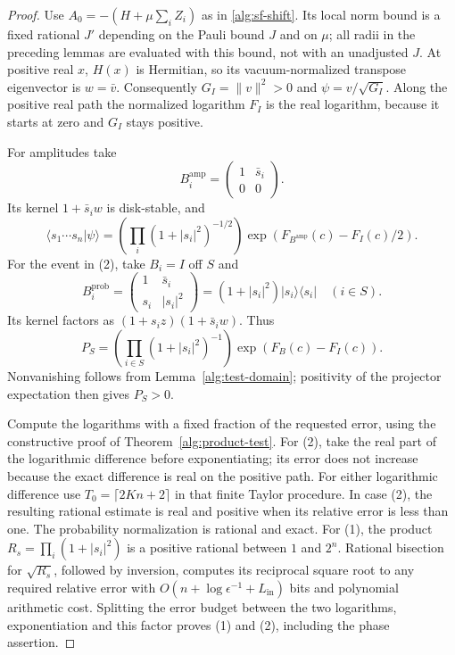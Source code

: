 \documentclass[reqno]{amsart}
\theoremstyle{definition}
\theoremstyle{remark}
\begin{document}
\begin{proof}
Use \(A_0=-(H+\mu\sum_iZ_i)\) as in
\eqref{alg:sf-shift}.  Its local norm bound is a fixed rational
\(J'\) depending on the Pauli bound \(J\) and on \(\mu\);
all radii in the preceding lemmas are evaluated with this
bound, not with an unadjusted \(J\).
At positive real \(x\), \(H(x)\) is Hermitian, so its
vacuum-normalized transpose eigenvector is \(w=\bar v\).
Consequently \(G_I=\|v\|^2>0\) and
\(\psi=v/\sqrt{G_I}\).  Along the positive real path the
normalized logarithm \(F_I\) is the real logarithm, because
it starts at zero and \(G_I\) stays positive.

For amplitudes take
\[
 B_i^{\mathrm{amp}}=
 \begin{pmatrix}1&\bar s_i\\0&0\end{pmatrix}.
\]
Its kernel \(1+\bar s_iw\) is disk-stable, and
\[
 \langle s_1\cdots s_n|\psi\rangle
 =\left(\prod_i(1+|s_i|^2)^{-1/2}\right)
       \exp(F_{B^{\mathrm{amp}}}(c)-F_I(c)/2).
\]
For the event in (2), take \(B_i=I\) off \(S\) and
\[
 B_i^{\mathrm{prob}}=
 \begin{pmatrix}1&\bar s_i\\s_i&|s_i|^2\end{pmatrix}
 =(1+|s_i|^2)|s_i\rangle\langle s_i|
 \quad(i\in S).
\]
Its kernel factors as \((1+s_iz)(1+\bar s_iw)\).
Thus
\[
 P_S=\left(\prod_{i\in S}(1+|s_i|^2)^{-1}\right)
                    \exp(F_B(c)-F_I(c)).
\]
Nonvanishing follows from Lemma~\ref{alg:test-domain};
positivity of the projector expectation then gives \(P_S>0\).

Compute the logarithms with a fixed fraction of the requested
error, using the constructive proof of
Theorem~\ref{alg:product-test}.  For (2), take the real part
of the logarithmic difference before exponentiating; its error
does not increase because the exact difference is real on
the positive path.  For either logarithmic difference use
\(T_0=\lceil2Kn+2\rceil\) in that finite Taylor procedure.
In case (2), the resulting rational estimate is real and
positive when its relative error is less than one.
The probability normalization is rational and exact.
For (1), the product \(R_s=\prod_i(1+|s_i|^2)\) is a positive
rational between \(1\) and \(2^n\).  Rational bisection for
\(\sqrt{R_s}\), followed by inversion, computes its reciprocal
square root to any required relative error with
\(O(n+\log\epsilon^{-1}+L_{\mathrm{in}})\) bits and
polynomial arithmetic cost.  Splitting the error budget
between the two logarithms, exponentiation and this factor
proves (1) and (2), including the phase assertion.


\end{proof}
\end{document}
